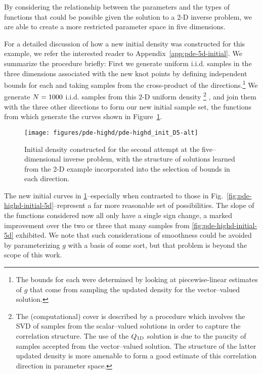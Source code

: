 By considering the relationship between the parameters and the types of functions that could be possible given the solution to a 2-D inverse problem, we are able to create a more restricted parameter space in five dimensions.

For a detailed discussion of how a new initial density was constructed for this example, we refer the interested reader to Appendix~\ref{app:pde-5d-initial}.
We summarize the procedure briefly:
First we generate uniform i.i.d. samples in the three dimensions associated with the new knot points by defining independent bounds for each and taking samples from the cross-product of the directions.\footnote{
The bounds for each were determined by looking at piecewise-linear estimates of $g$ that come from sampling the updated density for the vector--valued solution.
}
We generate $N=1000$ i.i.d. samples from this 2-D uniform density
\footnote{
The (computational) cover is described by a procedure which involves the SVD of samples from the scalar--valued solutions in order to capture the correlation structure.
The use of the $Q_\text{1D}$ solution is due to the paucity of samples accepted from the vector--valued solution.
The structure of the latter updated density is more amenable to form a good estimate of this correlation direction in parameter space.
}
, and join them with the three other directions to form our new initial sample set, the functions from which generate the curves shown in Figure~\ref{fig:pde-highd-alt-initial-5d}.

\begin{figure}
\centering
  \texttt{[image: figures/pde-highd/pde-highd\_init\_D5-alt]}
\caption{
Initial density constructed for the second attempt at the five--dimensional inverse problem, with the structure of solutions learned from the 2-D example incorporated into the selection of bounds in each direction.
}
\label{fig:pde-highd-alt-initial-5d}
\end{figure}

The new initial curves in \ref{fig:pde-highd-alt-initial-5d}\---especially when contrasted to those in Fig.~\ref{fig:pde-highd-initial-5d}\---represent a far more reasonable set of possibilities.
The slope of the functions considered now all only have a single sign change, a marked improvement over the two or three that many samples from \ref{fig:pde-highd-initial-5d} exhibited.
We note that such considerations of smoothness could be avoided by parameterizing $g$ with a basis of some sort, but that problem is beyond the scope of this work.

